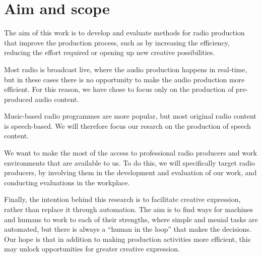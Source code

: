 
\section{Aim and scope}

The aim of this work is to develop and evaluate methods for radio production that improve the production process, such
as by increasing the efficiency, reducing the effort required or opening up new creative possibilities.

Most radio is broadcast live, where the audio production happens in real-time, but in these cases there is no
opportunity to make the audio production more efficient. For this reason, we have chose to focus only on the production
of pre-produced audio content.

Music-based radio programmes are more popular, but most original radio content is speech-based. We will therefore
focus our resarch on the production of speech content.

We want to make the most of the access to professional radio producers and work environments that are available to us.
To do this, we will specifically target radio producers, by involving them in the development and evaluation of our
work, and conducting evaluations in the workplace.


Finally, the intention behind this research is to facilitate creative expression, rather than replace it through
automation.  The aim is to find ways for machines and humans to work to each of their strengths, where simple and
menial tasks are automated, but there is always a ``human in the loop'' that makes the decisions.  Our hope is
that in addition to making production activities more efficient, this may unlock opportunities for greater creative
expression.

